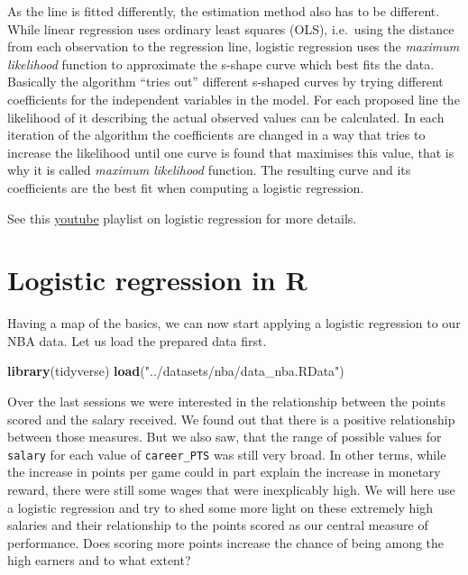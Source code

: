 \documentclass[
]{book}
\newenvironment{Shaded}{\begin{snugshade}}{\end{snugshade}}
\newcommand{\FunctionTok}[1]{\textcolor[rgb]{0.13,0.29,0.53}{\textbf{#1}}}
\newcommand{\NormalTok}[1]{#1}
\newcommand{\StringTok}[1]{\textcolor[rgb]{0.31,0.60,0.02}{#1}}
\begin{document}
As the line is fitted differently, the estimation method also has to be
different. While linear regression uses ordinary least squares (OLS),
i.e.~using the distance from each observation to the regression line,
logistic regression uses the \emph{maximum likelihood} function to
approximate the s-shape curve which best fits the data. Basically the
algorithm ``tries out'' different s-shaped curves by trying different
coefficients for the independent variables in the model. For each
proposed line the likelihood of it describing the actual observed values
can be calculated. In each iteration of the algorithm the coefficients
are changed in a way that tries to increase the likelihood until one
curve is found that maximises this value, that is why it is called
\emph{maximum likelihood} function. The resulting curve and its coefficients
are the best fit when computing a logistic regression.

See this
\href{https://www.youtube.com/watch?v=yIYKR4sgzI8\&list=PLblh5JKOoLUKxzEP5HA2d-Li7IJkHfXSe\&ab_channel=StatQuestwithJoshStarmer}{youtube}
playlist on logistic regression for more details.

\hypertarget{logistic-regression-in-r}{%
\section{Logistic regression in R}\label{logistic-regression-in-r}}

Having a map of the basics, we can now start applying a logistic
regression to our NBA data. Let us load the prepared data first.

\begin{Shaded}
\begin{Highlighting}[]
\FunctionTok{library}\NormalTok{(tidyverse)}
\FunctionTok{load}\NormalTok{(}\StringTok{"../datasets/nba/data\_nba.RData"}\NormalTok{)}
\end{Highlighting}
\end{Shaded}

Over the last sessions we were interested in the relationship between
the points scored and the salary received. We found out that there is a
positive relationship between those measures. But we also saw, that the
range of possible values for \texttt{salary} for each value of \texttt{career\_PTS} was
still very broad. In other terms, while the increase in points per game
could in part explain the increase in monetary reward, there were still
some wages that were inexplicably high. We will here use a logistic
regression and try to shed some more light on these extremely high
salaries and their relationship to the points scored as our central
measure of performance. Does scoring more points increase the chance of
being among the high earners and to what extent?
\end{document}
